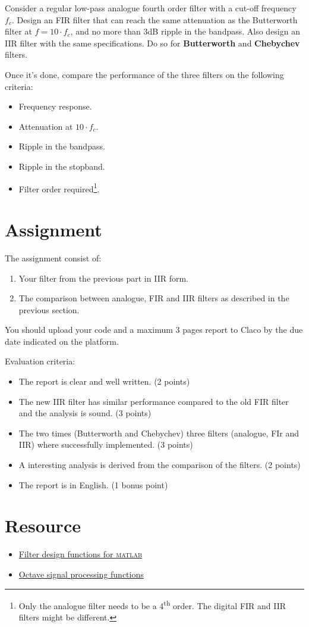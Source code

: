 \documentclass{../template/labo}
\newcommand{\matlab}{\textsc{matlab}}
\begin{document}
Consider a regular low-pass analogue fourth order filter with a cut-off frequency $f_c$.
Design an FIR filter that can reach the same attenuation as the Butterworth filter at $f = 10\cdot f_c$, and no more than 3dB ripple in the bandpass.
Also design an IIR filter with the same specifications.
Do so for \textbf{Butterworth} and \textbf{Chebychev} filters.

Once it's done, compare the performance of the three filters on the following criteria:
\begin{itemize}
  \item Frequency response.
  \item Attenuation at $10\cdot f_c$.
  \item Ripple in the bandpass.
  \item Ripple in the stopband.
  \item Filter order required\footnote{Only the analogue filter needs to be a 4\textsuperscript{th} order. The digital FIR and IIR filters might be different.}.
\end{itemize}



\section*{Assignment}
The assignment consist of:
\begin{enumerate}
  \item Your filter from the previous part in IIR form.
  \item The comparison between analogue, FIR and IIR filters as described in the previous section.
\end{enumerate}
You should upload your code and a maximum 3 pages report to Claco by the due date indicated on the platform.

Evaluation criteria:
\begin{itemize}
  \item The report is clear and well written. (2 points)
  \item The new IIR filter has similar performance compared to the old FIR filter and the analysis is sound. (3 points)
  \item The two times (Butterworth and Chebychev) three filters (analogue, FIr and IIR) where successfully implemented. (3 points)
  \item A interesting analysis is derived from the comparison of the filters. (2 points)
  \item The report is in English. (1 bonus point)
\end{itemize}




\section*{Resource}
\begin{itemize}
	\item \href{https://www.mathworks.com/help/signal/referencelist.html?type=function&category=filter-design&s_tid=CRUX_topnav}{Filter design functions for \matlab}
  \item \href{https://octave.sourceforge.io/signal/overview.html}{Octave signal processing functions}
\end{itemize}
\end{document}
